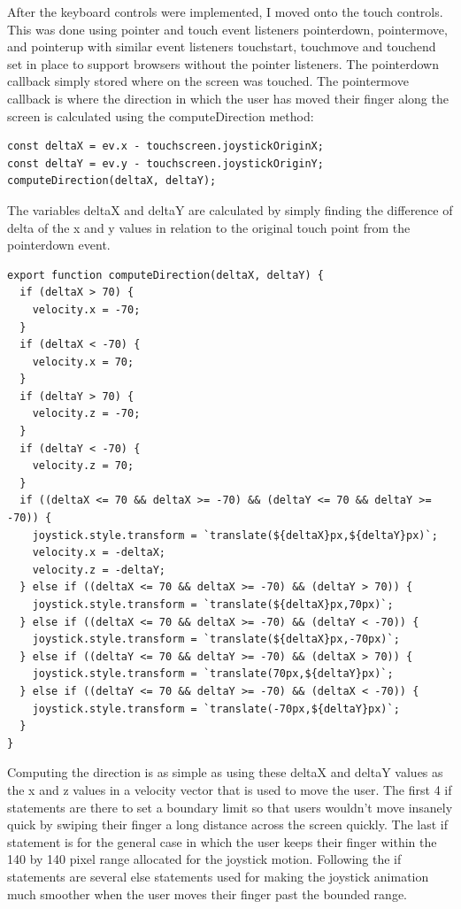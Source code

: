 \documentclass[onecolumn, draftclsnofoot,10pt, compsoc]{IEEEtran}
\begin{document}
After the keyboard controls were implemented, I moved onto the touch controls. This was done using pointer and touch event listeners pointerdown, pointermove, and pointerup with similar event listeners touchstart, touchmove and touchend set in place to support browsers without the pointer listeners. The pointerdown callback simply stored where on the screen was touched. The pointermove callback is where the direction in which the user has moved their finger along the screen is calculated using the computeDirection method:

\begin{lstlisting}
const deltaX = ev.x - touchscreen.joystickOriginX;
const deltaY = ev.y - touchscreen.joystickOriginY;
computeDirection(deltaX, deltaY);
\end{lstlisting}

The variables deltaX and deltaY are calculated by simply finding the difference of delta of the x and y values in relation to the original touch point from the pointerdown event.

\begin{lstlisting}
export function computeDirection(deltaX, deltaY) {
  if (deltaX > 70) {
    velocity.x = -70;
  }
  if (deltaX < -70) {
    velocity.x = 70;
  }
  if (deltaY > 70) {
    velocity.z = -70;
  }
  if (deltaY < -70) {
    velocity.z = 70;
  }
  if ((deltaX <= 70 && deltaX >= -70) && (deltaY <= 70 && deltaY >= -70)) {
    joystick.style.transform = `translate(${deltaX}px,${deltaY}px)`;
    velocity.x = -deltaX;
    velocity.z = -deltaY;
  } else if ((deltaX <= 70 && deltaX >= -70) && (deltaY > 70)) {
    joystick.style.transform = `translate(${deltaX}px,70px)`;
  } else if ((deltaX <= 70 && deltaX >= -70) && (deltaY < -70)) {
    joystick.style.transform = `translate(${deltaX}px,-70px)`;
  } else if ((deltaY <= 70 && deltaY >= -70) && (deltaX > 70)) {
    joystick.style.transform = `translate(70px,${deltaY}px)`;
  } else if ((deltaY <= 70 && deltaY >= -70) && (deltaX < -70)) {
    joystick.style.transform = `translate(-70px,${deltaY}px)`;
  }
}
\end{lstlisting}

Computing the direction is as simple as using these deltaX and deltaY values as the x and z values in a velocity vector that is used to move the user. The first 4 if statements are there to set a boundary limit so that users wouldn't move insanely quick by swiping their finger a long distance across the screen quickly. The last if statement is for the general case in which the user keeps their finger within the 140 by 140 pixel range allocated for the joystick motion. Following the if statements are several else statements used for making the joystick animation much smoother when the user moves their finger past the bounded range.
\end{document}
